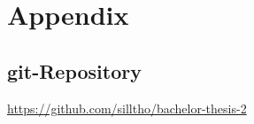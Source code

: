 \appendix

\section*{Appendix}
\renewcommand{\thesubsection}{\Alph{subsection}}

\subsection{git-Repository}
{\color{red}\url{https://github.com/silltho/bachelor-thesis-2}}
